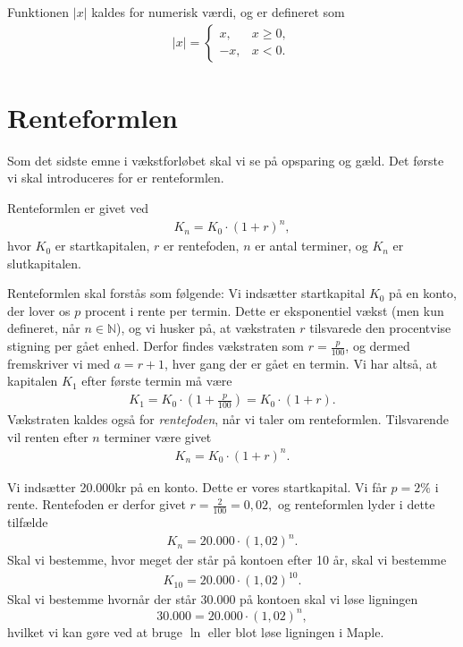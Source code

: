 \begin{defn}
Funktionen $|x|$ kaldes for numerisk værdi, og er defineret som
\begin{align*}
|x| = \begin{cases} x, \ &x\geq 0,
\\ -x, &x<0.
\end{cases}
\end{align*}
\end{defn}


\section*{Renteformlen}

Som det sidste emne i vækstforløbet skal vi se på opsparing og gæld. Det første vi skal introduceres for er renteformlen.
\begin{defn}
Renteformlen er givet ved 
\begin{align*}
K_n = K_0\cdot (1+r)^n, 
\end{align*}
hvor $K_0$ er startkapitalen, $r$ er rentefoden, $n$ er antal terminer, og $K_n$ er slutkapitalen. 
\end{defn}

Renteformlen skal forstås som følgende: Vi indsætter startkapital $K_0$ på en konto, der lover os $p$ procent i rente per termin. Dette er eksponentiel vækst (men kun defineret, når $n\in \mathbb{N}$), og vi husker på, at vækstraten $r$ tilsvarede den procentvise stigning per gået enhed. Derfor findes vækstraten som $r = \frac{p}{100}$, og dermed fremskriver vi med $a = r+1$, hver gang der er gået en termin. Vi har altså, at kapitalen $K_1$ efter første termin må være
\begin{align*}
K_1 = K_0\cdot (1+\frac{p}{100})   = K_0\cdot (1+r).
\end{align*}
Vækstraten kaldes også for \textit{rentefoden}, når vi taler om renteformlen. Tilsvarende vil renten efter $n$ terminer være givet
\begin{align*}
K_n = K_0\cdot (1+r)^n.
\end{align*}
\begin{exa}
Vi indsætter 20.000kr på en konto. Dette er vores startkapital. Vi får $p=2\%$ i rente. Rentefoden er derfor givet $r = \frac{2}{100} = 0,02,$ og renteformlen lyder i dette tilfælde
\begin{align*}
K_n = 20.000\cdot (1,02)^n.
\end{align*}
Skal vi bestemme, hvor meget der står på kontoen efter 10 år, skal vi bestemme 
\begin{align*}
K_{10} = 20.000\cdot (1,02)^{10}.
\end{align*}
Skal vi bestemme hvornår der står $30.000$ på kontoen skal vi løse ligningen
\[
30.000 = 20.000\cdot (1,02)^n,
\]
hvilket vi kan gøre ved at bruge $\ln$ eller blot løse ligningen i Maple.
\end{exa}
